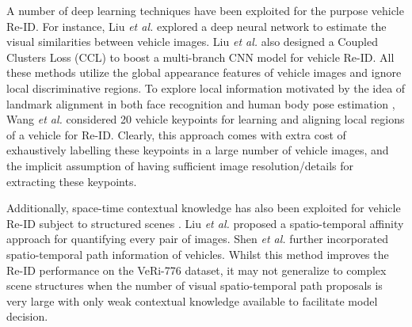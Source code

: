 \documentclass[10pt,twocolumn,letterpaper]{article}
\def\etal{\emph{et al.\hspace{0.3em}}}
\begin{document}
A number of deep learning techniques have been exploited for the purpose vehicle Re-ID. For instance, Liu
\etal \cite{liu2016veri} explored a deep neural network to estimate the
visual similarities between vehicle images.
%
Liu \etal \cite{liu2016vehicleid} also designed a Coupled Clusters Loss (CCL)
to boost a multi-branch CNN model for vehicle Re-ID.
%
All these methods utilize the global appearance features of vehicle images and
ignore local discriminative regions.
%
To explore local information motivated by the idea of landmark alignment
\cite{zhang2014facial} in both face recognition \cite{taigman2014deepface} and
human body pose estimation \cite{newell2016stacked}, Wang \etal
\cite{wang2017orientation} considered 20 vehicle keypoints for learning and aligning
local regions of a vehicle for Re-ID.  Clearly, this approach comes with extra
cost of exhaustively labelling these keypoints in a large number of vehicle
images, and the implicit assumption of having sufficient image
resolution/details for extracting these keypoints.
%

Additionally,
space-time contextual knowledge has also been exploited for vehicle Re-ID
subject to structured scenes \cite{liu2016veri,Shen_2017_ICCV}.
Liu \etal \cite{liu2016veri} proposed
a spatio-temporal affinity approach for quantifying every pair of images.
%
Shen \etal \cite{Shen_2017_ICCV} further
incorporated spatio-temporal path information of vehicles.
Whilst this method improves the Re-ID performance on the VeRi-776 dataset,
it may not generalize to complex scene structures when the number of
visual spatio-temporal path proposals is very large with only weak contextual
knowledge available to facilitate model decision.
\end{document}
